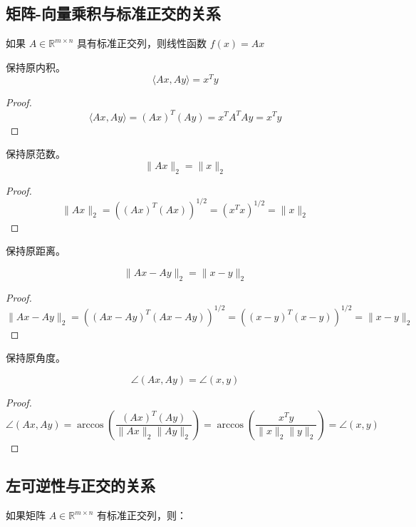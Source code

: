 \subsection{矩阵-向量乘积与标准正交的关系}

如果 $ A \in \mathbb{R}^{m \times n} $ 具有标准正交列，则线性函数 $ f(x)=A x $

\begin{theorem}
    保持原内积。
    $$ \langle A x, A y\rangle=x^{T} y $$
\end{theorem}

\begin{proof}
    $$ \langle A x, A y\rangle=(A x)^{T}(A y)=x^{T} A^{T} A y=x^{T} y $$
\end{proof}


\begin{theorem}
    保持原范数。
    $$
    \|A x\|_{2}=\|x\|_{2}
    $$
\end{theorem}

\begin{proof}
   $$
\|A x\|_{2}=\left((A x)^{T}(A x)\right)^{1 / 2}=\left(x^{T} x\right)^{1 / 2}=\|x\|_{2}
$$
\end{proof}

\begin{theorem}
    保持原距离。

    $$
    \|A x-A y\|_{2}=\|x-y\|_{2}
    $$
\end{theorem}

\begin{proof}
   $$
\|A x-A y\|_{2}=\left((A x-A y)^{T}(A x-A y)\right)^{1 / 2}=\left((x-y)^{T}(x-y)\right)^{1 / 2}=\|x-y\|_{2}
$$
\end{proof}

\begin{theorem}
    保持原角度。

    $$ \angle(A x, A y)=\angle(x, y) $$
\end{theorem}

\begin{proof}
    $$ \angle(A x, A y)=\arccos \left(\frac{(A x)^{T}(A y)}{\|A x\|_{2}\|A y\|_{2}}\right)=\arccos \left(\frac{x^{T} y}{\|x\|_{2}\|y\|_{2}}\right)=\angle(x, y) $$
\end{proof}

\subsection{左可逆性与正交的关系}


如果矩阵 $ A \in \mathbb{R}^{m \times n} $ 有标准正交列，则：

